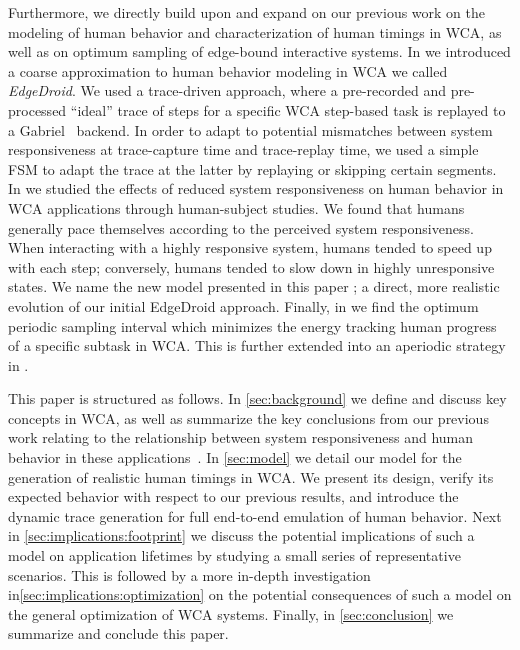 Furthermore, we directly build upon and expand on our previous work on the modeling of human behavior and characterization of human timings in \ac{WCA}, as well as on optimum sampling of edge-bound interactive systems.
In \textcite{olguin2018scaling,olguin2019edgedroid} we introduced a coarse approximation to human behavior modeling in \ac{WCA} we called \emph{EdgeDroid}.
We used a trace-driven approach, where a pre-recorded and pre-processed ``ideal'' trace of steps for a specific \ac{WCA} step-based task is replayed to a Gabriel~\cite{Chen2018application} backend.
In order to adapt to potential mismatches between system responsiveness at trace-capture time and trace-replay time, we used a simple \ac{FSM} to adapt the trace at the latter by replaying or skipping certain segments.
In \textcite{olguinmunoz:impact2021} we studied the effects of reduced system responsiveness on human behavior in \ac{WCA} applications through human-subject studies.
We found that humans generally pace themselves according to the perceived system responsiveness.
When interacting with a highly responsive system, humans tended to speed up with each step; conversely, humans tended to slow down in highly unresponsive states.
We name the new model presented in this paper \emph{\edgedroid}; a direct, more realistic evolution of our initial EdgeDroid approach.
Finally, in \textcite{Moothedath2021EnergyOptimal,Moothedath2022EnergyEfficient} we find the optimum periodic sampling interval which minimizes the energy tracking human progress of a specific subtask in \ac{WCA}.
This is further extended into an aperiodic strategy in \textcite{Moothedath2022Aperiodic}.

This paper is structured as follows.
In \cref{sec:background} we define and discuss key concepts in \ac{WCA}, as well as summarize the key conclusions from our previous work relating to the relationship between system responsiveness and human behavior in these applications~\cite{olguinmunoz:impact2021}.
In \cref{sec:model} we detail our model for the generation of realistic human timings in \ac{WCA}.
We present its design, verify its expected behavior with respect to our previous results, and introduce the dynamic trace generation for full end-to-end emulation of human behavior.
Next in \cref{sec:implications:footprint} we discuss the potential implications of such a model on application lifetimes by studying a small series of representative scenarios.
This is followed by a more in-depth investigation in\cref{sec:implications:optimization} on the potential consequences of such a model on the general optimization of \ac{WCA} systems.
Finally, in \cref{sec:conclusion} we summarize and conclude this paper.

